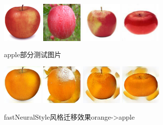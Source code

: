 \documentclass[conference]{IEEEtran}
\begin{document}
\begin{figure}[H]
	\centering
	\includegraphics[width=2cm]{PIC/apple2orange/n07740461_1190_real_A.png}
	\includegraphics[width=2cm]{PIC/apple2orange/n07740461_10571_real_A.png}
	\includegraphics[width=2cm]{PIC/apple2orange/n07740461_12300_real_A.png}
	\includegraphics[width=2cm]{PIC/apple2orange/n07740461_12360_real_A.png}
	\caption{apple部分测试图片}
\end{figure}

\begin{figure}[H]
	\centering
	\includegraphics[width=2cm]{PIC/apple2orange/oa1.jpg}
	\includegraphics[width=2cm]{PIC/apple2orange/oa2.jpg}
	\includegraphics[width=2cm]{PIC/apple2orange/oa3.jpg}
	\includegraphics[width=2cm]{PIC/apple2orange/oa4.jpg}
	\caption{fastNeuralStyle风格迁移效果orange->apple}
\end{figure}
\end{document}
